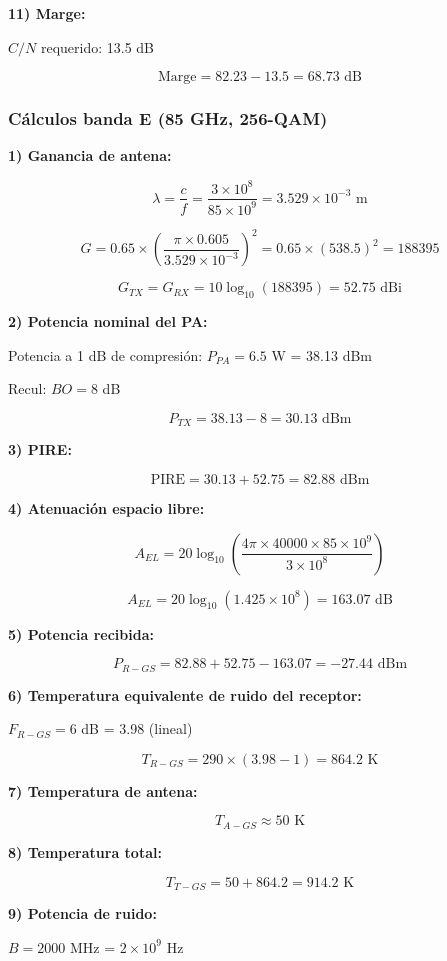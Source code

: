 \documentclass[12pt,a4paper]{extarticle}
\begin{document}
\textbf{11) Marge:}

$C/N$ requerido: 13.5 dB

$$\text{Marge} = 82.23 - 13.5 = 68.73 \text{ dB}$$

\subsubsection*{Cálculos banda E (85 GHz, 256-QAM)}

\textbf{1) Ganancia de antena:}

$$\lambda = \frac{c}{f} = \frac{3 \times 10^8}{85 \times 10^9} = 3.529 \times 10^{-3} \text{ m}$$

$$G = 0.65 \times \left(\frac{\pi \times 0.605}{3.529 \times 10^{-3}}\right)^2 = 0.65 \times (538.5)^2 = 188395$$

$$G_{TX} = G_{RX} = 10 \log_{10}(188395) = 52.75 \text{ dBi}$$

\textbf{2) Potencia nominal del PA:}

Potencia a 1 dB de compresión: $P_{PA} = 6.5$ W = 38.13 dBm

Recul: $BO = 8$ dB

$$P_{TX} = 38.13 - 8 = 30.13 \text{ dBm}$$

\textbf{3) PIRE:}

$$\text{PIRE} = 30.13 + 52.75 = 82.88 \text{ dBm}$$

\textbf{4) Atenuación espacio libre:}

$$A_{EL} = 20 \log_{10}\left(\frac{4\pi \times 40000 \times 85 \times 10^9}{3 \times 10^8}\right)$$

$$A_{EL} = 20 \log_{10}(1.425 \times 10^8) = 163.07 \text{ dB}$$

\textbf{5) Potencia recibida:}

$$P_{R-GS} = 82.88 + 52.75 - 163.07 = -27.44 \text{ dBm}$$

\textbf{6) Temperatura equivalente de ruido del receptor:}

$F_{R-GS} = 6$ dB = 3.98 (lineal)

$$T_{R-GS} = 290 \times (3.98 - 1) = 864.2 \text{ K}$$

\textbf{7) Temperatura de antena:}

$$T_{A-GS} \approx 50 \text{ K}$$

\textbf{8) Temperatura total:}

$$T_{T-GS} = 50 + 864.2 = 914.2 \text{ K}$$

\textbf{9) Potencia de ruido:}

$B = 2000$ MHz = $2 \times 10^9$ Hz
\end{document}
